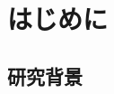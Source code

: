 \documentclass[./Paper]{subfiles}
\begin{document}
\section{はじめに}
\subsection{研究背景}

% 
% 
\end{document}
